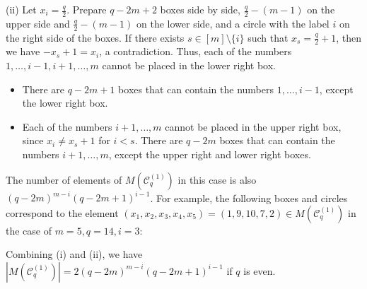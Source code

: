\documentclass{article}
\theoremstyle{plain}
\theoremstyle{definition}
\theoremstyle{remark}
\numberwithin{equation}{section}
\newcommand{\Cc}{\mathcal{C}}
\begin{document}
(i\hspace{-0.5mm}i) Let $\displaystyle x_i=\frac{q}{2}$.
Prepare $q-2m+2$ boxes side by side, $\displaystyle \frac{q}{2}-(m-1)$ on the upper side and $\displaystyle \frac{q}{2}-(m-1)$ on the lower side, and a circle with the label $i$ on the right side of the boxes.
If there exists $s\in[m]\setminus\{i\}$ such that $\displaystyle x_s=\frac{q}{2}+1$, then we have $-x_s+1=x_i$, a contradiction. 
Thus, each of the numbers $1,\dots,i-1,i+1,\dots,m$ cannot be placed in the lower right box.
\begin{center}
\end{center}
\begin{itemize}
\item There are $q-2m+1$ boxes that can contain the numbers $1,\dots,i-1$, except the lower right box.

\item Each of the numbers $i+1,\dots,m$ cannot be placed in the upper right box, since $x_i\neq x_s+1$ for $i<s$.
There are $q-2m$ boxes that can contain the numbers $i+1,\dots,m$, except the upper right and lower right boxes.
\end{itemize}
The number of elements of $M(\Cc^{(1)}_q)$ in this case is also $(q-2m)^{m-i}(q-2m+1)^{i-1}$.
For example, the following boxes and circles correspond to the element $(x_1,x_2,x_3,x_4,x_5)=(1,9,10,7,2)\in M(\Cc^{(1)}_q)$ in the case of $m=5,q=14,i=3$:
\begin{center}
\end{center}
Combining (i) and (i\hspace{-0.5mm}i), we have $|M(\Cc^{(1)}_q)|=2(q-2m)^{m-i}(q-2m+1)^{i-1}$ if $q$ is even.
\end{document}
